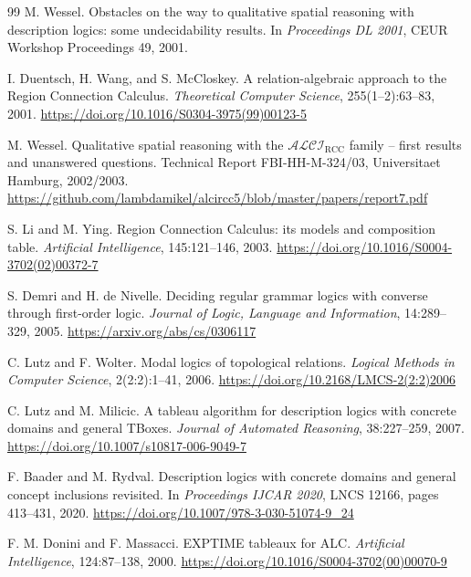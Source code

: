 \documentclass[11pt]{article}
\begin{document}
\begin{thebibliography}{99}
M. Wessel.
\newblock Obstacles on the way to qualitative spatial reasoning with description
logics: some undecidability results.
\newblock In \emph{Proceedings DL 2001}, CEUR Workshop Proceedings 49, 2001.

I. Duentsch, H. Wang, and S. McCloskey.
\newblock A relation-algebraic approach to the Region Connection Calculus.
\newblock \emph{Theoretical Computer Science}, 255(1--2):63--83, 2001.
\newblock \url{https://doi.org/10.1016/S0304-3975(99)00123-5}

M. Wessel.
\newblock Qualitative spatial reasoning with the $\mathcal{ALCI}_{\mathrm{RCC}}$
family -- first results and unanswered questions.
\newblock Technical Report FBI-HH-M-324/03, Universitaet Hamburg, 2002/2003.
\newblock \url{https://github.com/lambdamikel/alcircc5/blob/master/papers/report7.pdf}

S. Li and M. Ying.
\newblock Region Connection Calculus: its models and composition table.
\newblock \emph{Artificial Intelligence}, 145:121--146, 2003.
\newblock \url{https://doi.org/10.1016/S0004-3702(02)00372-7}

S. Demri and H. de Nivelle.
\newblock Deciding regular grammar logics with converse through first-order logic.
\newblock \emph{Journal of Logic, Language and Information}, 14:289--329, 2005.
\newblock \url{https://arxiv.org/abs/cs/0306117}

C. Lutz and F. Wolter.
\newblock Modal logics of topological relations.
\newblock \emph{Logical Methods in Computer Science}, 2(2:2):1--41, 2006.
\newblock \url{https://doi.org/10.2168/LMCS-2(2:2)2006}

C. Lutz and M. Milicic.
\newblock A tableau algorithm for description logics with concrete domains and general
TBoxes.
\newblock \emph{Journal of Automated Reasoning}, 38:227--259, 2007.
\newblock \url{https://doi.org/10.1007/s10817-006-9049-7}

F. Baader and M. Rydval.
\newblock Description logics with concrete domains and general concept inclusions
revisited.
\newblock In \emph{Proceedings IJCAR 2020}, LNCS 12166, pages 413--431, 2020.
\newblock \url{https://doi.org/10.1007/978-3-030-51074-9_24}

F. M. Donini and F. Massacci.
\newblock EXPTIME tableaux for ALC.
\newblock \emph{Artificial Intelligence}, 124:87--138, 2000.
\newblock \url{https://doi.org/10.1016/S0004-3702(00)00070-9}


\end{thebibliography}
\end{document}
